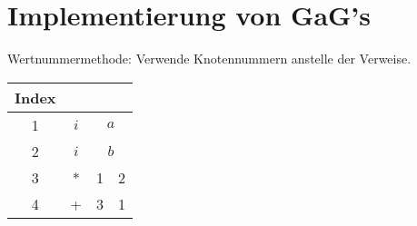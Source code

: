 \begin{description}
\begin{center}
{{{{{                            
                        }
                    }
                    \Tr{*}
                }
            }
            \Tr{+}
        }
    \end{center}
\end{description}

\section{Implementierung von GaG's}
Wertnummermethode: Verwende Knotennummern anstelle der Verweise.
\Bsp
\begin{center}
    \begin{tabular}{|c|c|c|c|}
     Index & \multicolumn{3}{|c|}{ } \\\hline
     1 & $i$ & \multicolumn{2}{|c|}{$a$} \\\hline
     2 & $i$ & \multicolumn{2}{|c|}{$b$} \\\hline
     3 & * & 1 & 2 \\\hline
     4 & + & 3 & 1 \\\hline
    \end{tabular}
\end{center}


